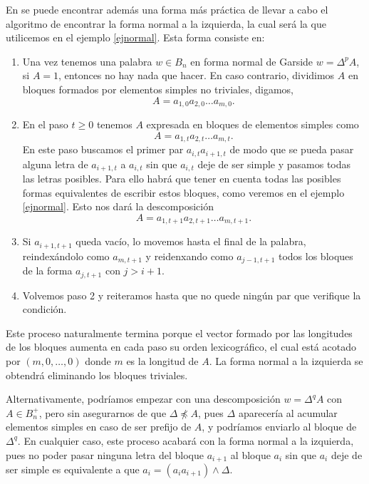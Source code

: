 \documentclass[TFG.tex]{subfiles}
\begin{document}

En \cite{Thurston} se puede encontrar además una forma más práctica de llevar a cabo el algoritmo de encontrar la forma normal a la izquierda, la cual será la que utilicemos en el ejemplo \ref{ejnormal}. Esta forma consiste en:
\begin{enumerate}
\item Una vez tenemos una palabra $w\in B_n$ en forma normal de Garside $w=\Delta^p A$, si $A=1$, entonces no hay nada que hacer. En caso contrario, dividimos $A$ en bloques formados por elementos simples no triviales, digamos, $$A=a_{1,0}a_{2,0}\dots a_{m,0}.$$
\item En el paso $t\geq 0$ tenemos $A$ expresada en bloques de elementos simples como
$$A=a_{1,t}a_{2,t}\dots a_{m,t}.$$
En este paso buscamos el primer par $a_{i,t}a_{i+1,t}$ de modo que se pueda pasar alguna letra de $a_{i+1,t}$ a $a_{i,t}$ sin que $a_{i,t}$ deje de ser simple y pasamos todas las letras posibles. Para ello habrá que tener en cuenta todas las posibles formas equivalentes de escribir estos bloques, como veremos en el ejemplo \ref{ejnormal}. Esto nos dará la descomposición 
$$A=a_{1,t+1}a_{2,t+1}\dots a_{m,t+1}.$$
\item Si $a_{i+1,t+1}$ queda vacío, lo movemos hasta el final de la palabra, reindexándolo como $a_{m,t+1}$ y reidenxando como $a_{j-1,t+1}$ todos los bloques de la forma $a_{j,t+1}$ con $j>i+1$. 
\item Volvemos paso 2 y reiteramos hasta que no quede ningún par que verifique la condición. 
\end{enumerate} 

Este proceso naturalmente termina porque el vector formado por las longitudes de los bloques aumenta en cada paso su orden lexicográfico, el cual está acotado por $(m,0,\dots, 0)$ donde $m$ es la longitud de $A$. La forma normal a la izquierda se obtendrá eliminando los bloques triviales.

Alternativamente, podríamos empezar con una descomposición $w=\Delta^qA$ con $A\in B_n^+$, pero sin asegurarnos de que $\Delta \not\preccurlyeq A$, pues $\Delta$ aparecería al acumular elementos simples en caso de ser prefijo de $A$, y podríamos enviarlo al bloque de $\Delta^q$. En cualquier caso, este proceso acabará con la forma normal a la izquierda, pues no poder pasar ninguna letra del bloque $a_{i+1}$ al bloque $a_i$ sin que $a_i$ deje de ser simple es equivalente a que $a_i=(a_ia_{i+1})\land \Delta$. 
\end{document}
